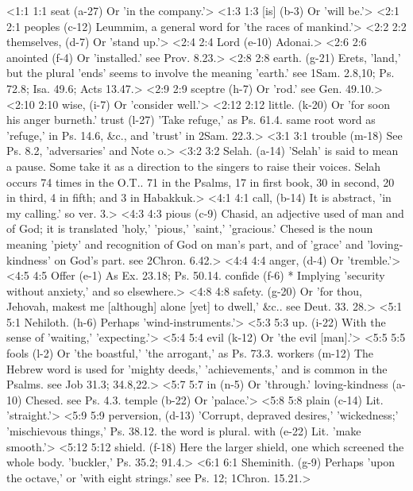 <1:1 1:1  seat (a-27)  Or 'in the company.'>
<1:3 1:3  [is] (b-3)  Or 'will be.'>
<2:1 2:1  peoples (c-12)  Leummim, a general word for 'the races of mankind.'>
<2:2 2:2  themselves, (d-7)  Or 'stand up.'>
<2:4 2:4  Lord (e-10)  Adonai.>
<2:6 2:6  anointed (f-4)  Or 'installed.' see Prov. 8.23.>
<2:8 2:8  earth. (g-21)  Erets, 'land,' but the plural 'ends' seems to involve the  meaning 'earth.' see 1Sam. 2.8,10; Ps. 72.8; Isa. 49.6; Acts 13.47.>
<2:9 2:9  sceptre (h-7)  Or 'rod.' see Gen. 49.10.>
<2:10 2:10  wise, (i-7)  Or 'consider well.'>
<2:12 2:12  little. (k-20)  Or 'for soon his anger burneth.'
  trust (l-27)  'Take refuge,' as Ps. 61.4. same root word as 'refuge,' in  Ps. 14.6, &c., and 'trust' in 2Sam. 22.3.>
<3:1 3:1  trouble (m-18)  See Ps. 8.2, 'adversaries' and Note o.>
<3:2 3:2  Selah. (a-14)  'Selah' is said to mean a pause. Some take it as a direction  to the singers to raise their voices. Selah occurs 74 times in  the O.T.. 71 in the Psalms, 17 in first book, 30 in second, 20  in third, 4 in fifth; and 3 in Habakkuk.>
<4:1 4:1  call, (b-14)  It is abstract, 'in my calling.' so ver. 3.>
<4:3 4:3  pious (c-9)  Chasid, an adjective used of man and of God; it is  translated 'holy,' 'pious,' 'saint,' 'gracious.' Chesed is  the noun meaning 'piety' and recognition of God on man's part,  and of 'grace' and 'loving-kindness' on God's part. see 2Chron. 6.42.>
<4:4 4:4  anger, (d-4)  Or 'tremble.'>
<4:5 4:5  Offer (e-1)  As Ex. 23.18; Ps. 50.14.
  confide (f-6)  * Implying 'security without anxiety,' and so elsewhere.>
<4:8 4:8  safety. (g-20)  Or 'for thou, Jehovah, makest me [although] alone [yet] to  dwell,' &c.. see Deut. 33. 28.>
<5:1 5:1  Nehiloth. (h-6)  Perhaps 'wind-instruments.'>
<5:3 5:3  up. (i-22)  With the sense of 'waiting,' 'expecting.'>
<5:4 5:4  evil (k-12)  Or 'the evil [man].'>
<5:5 5:5  fools (l-2)  Or 'the boastful,' 'the arrogant,' as Ps. 73.3.
  workers (m-12)  The Hebrew word is used for 'mighty deeds,' 'achievements,'  and is common in the Psalms. see Job 31.3; 34.8,22.>
<5:7 5:7  in (n-5)  Or 'through.'
  loving-kindness (a-10)  Chesed. see Ps. 4.3.
  temple (b-22)  Or 'palace.'>
<5:8 5:8  plain (c-14)  Lit. 'straight.'>
<5:9 5:9  perversion, (d-13)  'Corrupt, depraved desires,' 'wickedness;' 'mischievous  things,' Ps. 38.12. the word is plural.
  with (e-22)  Lit. 'make smooth.'>
<5:12 5:12  shield. (f-18)  Here the larger shield, one which screened the whole body.  'buckler,' Ps. 35.2; 91.4.>
<6:1 6:1  Sheminith. (g-9)  Perhaps 'upon the octave,' or 'with eight strings.' see Ps.  12; 1Chron. 15.21.>
